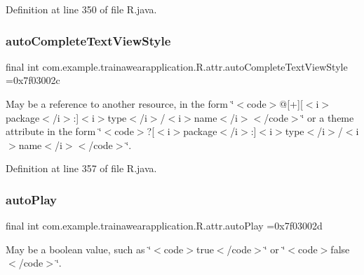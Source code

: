 Definition at line 350 of file R.\+java.

\mbox{\label{classcom_1_1example_1_1trainawearapplication_1_1_r_1_1attr_af48345cbccc6a9208c52fbc16d582e6e}} 
\subsubsection{\texorpdfstring{autoCompleteTextViewStyle}{autoCompleteTextViewStyle}}
{\footnotesize\ttfamily final int com.\+example.\+trainawearapplication.\+R.\+attr.\+auto\+Complete\+Text\+View\+Style =0x7f03002c\hspace{0.3cm}{\ttfamily [static]}}

May be a reference to another resource, in the form \char`\"{}$<$code$>$@\mbox{[}+\mbox{]}\mbox{[}$<$i$>$package$<$/i$>$\+:\mbox{]}$<$i$>$type$<$/i$>$/$<$i$>$name$<$/i$>$$<$/code$>$\char`\"{} or a theme attribute in the form \char`\"{}$<$code$>$?\mbox{[}$<$i$>$package$<$/i$>$\+:\mbox{]}$<$i$>$type$<$/i$>$/$<$i$>$name$<$/i$>$$<$/code$>$\char`\"{}. 

Definition at line 357 of file R.\+java.

\mbox{\label{classcom_1_1example_1_1trainawearapplication_1_1_r_1_1attr_af90b86296052277a57c2a5decdb1e2de}} 
\subsubsection{\texorpdfstring{autoPlay}{autoPlay}}
{\footnotesize\ttfamily final int com.\+example.\+trainawearapplication.\+R.\+attr.\+auto\+Play =0x7f03002d\hspace{0.3cm}{\ttfamily [static]}}

May be a boolean value, such as \char`\"{}$<$code$>$true$<$/code$>$\char`\"{} or \char`\"{}$<$code$>$false$<$/code$>$\char`\"{}. 

